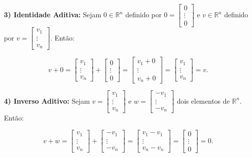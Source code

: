 \begin{Proof}
	\textbf{3) Identidade Aditiva:} Sejam $0\in\mathbb{R}^n$ definido por $0 = \begin{bmatrix}
		0 \\
		\vdots \\
		0
	\end{bmatrix}$ e $v\in\mathbb{R}^n$ definido por $v = \begin{bmatrix}
		v_1 \\
		\vdots \\
		v_n
	\end{bmatrix}$. Então:
	
	$$
	v + 0 = \begin{bmatrix}
		v_1 \\
		\vdots \\
		v_n
	\end{bmatrix} + \begin{bmatrix}
	0 \\
	\vdots \\
	0
	\end{bmatrix} = \begin{bmatrix}
		v_1 + 0\\
		\vdots \\
		v_n + 0
	\end{bmatrix} = \begin{bmatrix}
		v_1 \\
		\vdots \\
		v_n
	\end{bmatrix} = v.
	$$
	
	\textbf{4) Inverso Aditivo:} Sejam $v = \begin{bmatrix}
		v_1 \\
		\vdots \\
		v_n
	\end{bmatrix}$ e $w = \begin{bmatrix}
		-v_1 \\
		\vdots \\
		-v_n
	\end{bmatrix}$ dois elementos de $\mathbb{R}^n$. Então:
	
	$$
	v + w = \begin{bmatrix}
		v_1 \\
		\vdots \\
		v_n
	\end{bmatrix} + \begin{bmatrix}
		-v_1 \\
		\vdots \\
		-v_n
	\end{bmatrix} = \begin{bmatrix}
		v_1 - v_1 \\
		\vdots \\
		v_n - v_n
	\end{bmatrix} = \begin{bmatrix}
		0 \\
		\vdots \\
		0
	\end{bmatrix} = 0.
	$$
	

\end{Proof}

